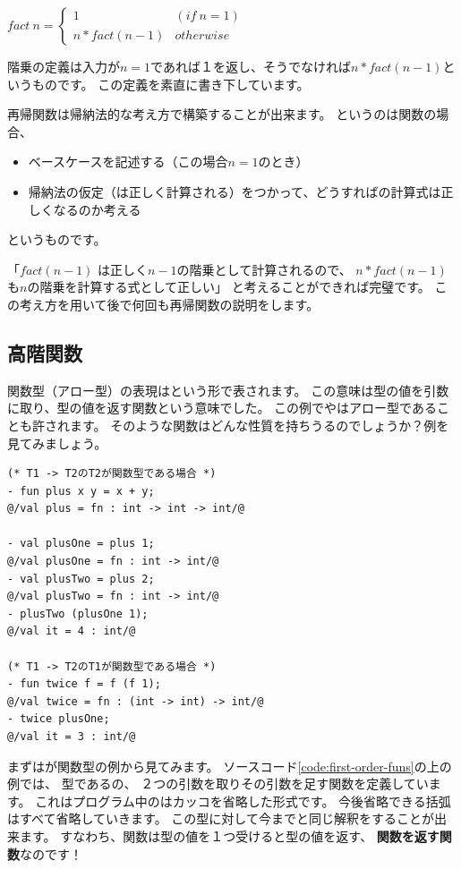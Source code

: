 \documentclass[11pt,a4paper]{jarticle}
\begin{document}
$fact \ n = \begin{cases} 1 & (if \ n = 1) \\ n * fact (n - 1) & otherwise \end{cases}$

階乗の定義は入力が$n=1$であれば１を返し、そうでなければ$n * fact (n - 1)$というものです。
この定義を素直に書き下しています。

再帰関数は帰納法的な考え方で構築することが出来ます。
というのは関数の場合、
\begin{itemize}
\item ベースケースを記述する（この場合$n=1$のとき）
\item 帰納法の仮定（は正しく計算される）をつかって、どうすればの計算式は正しくなるのか考える
\end{itemize}
というものです。

「$fact (n - 1)$ は正しく$n - 1$の階乗として計算されるので、
$n * fact (n - 1)$も$n$の階乗を計算する式として正しい」
と考えることができれば完璧です。
この考え方を用いて後で何回も再帰関数の説明をします。

\subsection{高階関数}
関数型（アロー型）の表現はという形で表されます。
この意味は型の値を引数に取り、型の値を返す関数という意味でした。
この例でやはアロー型であることも許されます。
そのような関数はどんな性質を持ちうるのでしょうか？例を見てみましょう。

\begin{lstlisting}[caption=第一級関数,label=code:first-order-funs]
(* T1 -> T2のT2が関数型である場合 *)
- fun plus x y = x + y;
@/val plus = fn : int -> int -> int/@

- val plusOne = plus 1;
@/val plusOne = fn : int -> int/@
- val plusTwo = plus 2;
@/val plusTwo = fn : int -> int/@
- plusTwo (plusOne 1);
@/val it = 4 : int/@

(* T1 -> T2のT1が関数型である場合 *)
- fun twice f = f (f 1);
@/val twice = fn : (int -> int) -> int/@
- twice plusOne;
@/val it = 3 : int/@
\end{lstlisting}

まずはが関数型の例から見てみます。
ソースコード\ref{code:first-order-funs}の上の例では、
型であるの、
２つの引数を取りその引数を足す関数を定義しています。
これはプログラム中のはカッコを省略した形式です。
今後省略できる括弧はすべて省略していきます。
この型に対して今までと同じ解釈をすることが出来ます。
すなわち、関数は型の値を１つ受けると型の値を返す、
{\bfseries 関数を返す関数}なのです！
\end{document}
